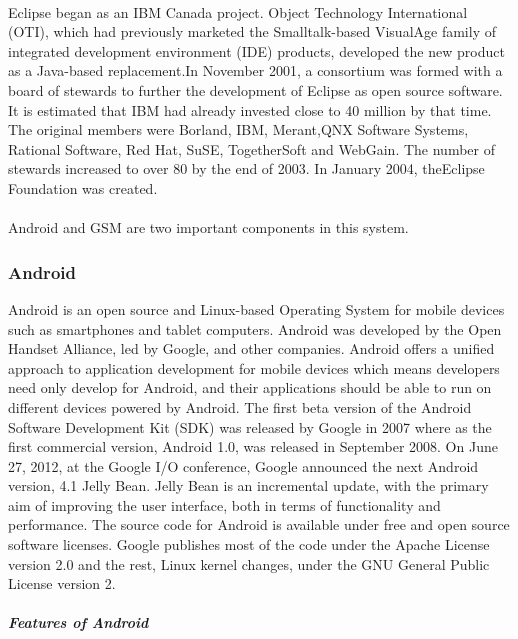 \paragraph{}
Eclipse began as an IBM Canada project. Object Technology International (OTI), which had previously marketed the Smalltalk-based VisualAge family of integrated development environment (IDE) products, developed the new product as a Java-based replacement.In November 2001, a consortium was formed with a board of stewards to further the development of Eclipse as open source software. It is estimated that IBM had already invested close to 40 million by that time. The original members were Borland, IBM, Merant,QNX Software Systems, Rational Software, Red Hat, SuSE, TogetherSoft and WebGain. The number of stewards increased to over 80 by the end of 2003. In January 2004, theEclipse Foundation was created.
\paragraph{}
Android and GSM are two important components in this system.
\subsubsection{Android}
Android is an open source and Linux-based Operating System for mobile devices such as smartphones and tablet computers. Android was developed by the Open Handset Alliance, led by Google, and other companies. Android offers a unified approach to application development for mobile devices which means developers need only develop for Android, and their applications should be able to run on different devices powered by Android. The first beta version of the Android Software Development Kit (SDK) was released by Google in 2007 where as the first commercial version, Android 1.0, was released in September 2008. On June 27, 2012, at the Google I/O conference, Google announced the next Android version, 4.1 Jelly Bean. Jelly Bean is an incremental update, with the primary aim of improving the user interface, both in terms of functionality and performance. The source code for Android is available under free and open source software licenses. Google publishes most of the code under the Apache License version 2.0 and the rest, Linux kernel changes, under the GNU General Public License version 2.
\subparagraph{\textbf{Features of Android}}
